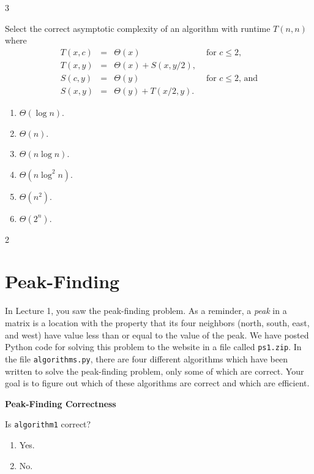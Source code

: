 \documentclass[12pt,twoside]{article}
\begin{document}
\begin{problems}
\begin{problemparts}
\ifsolution \solution{}
3
\fi

\problempart {}
Select the correct asymptotic complexity
of an algorithm with runtime $T(n, n)$
where 
$$
\begin{array}{rcll}
T(x, c) &=& \Theta(x) & \textrm{ for $c \le 2$}, \\
T(x, y) &=& \Theta(x) + S(x, y / 2), \\
S(c, y) &=& \Theta(y) & \textrm{ for $c \le 2$, and} \\
S(x, y) &=& \Theta(y) + T(x / 2, y).
\end{array}
$$

\begin{enumerate}
\item $\Theta(\log n)$.
\item $\Theta(n)$.
\item $\Theta(n \log n)$.
\item $\Theta(n \log^2 n)$.
\item $\Theta(n^2)$.
\item $\Theta(2^n)$.
\end{enumerate}

\ifsolution \solution{}
2
\fi

\end{problemparts}

\section*{Peak-Finding}

In Lecture 1,
you saw the peak-finding problem.
As a reminder,
a \emph{peak} in a matrix
is a location with the property that its four neighbors
(north, south, east, and west)
have value less than or equal to the value of the peak.
We have posted Python code for solving this problem
to the website in a file called \texttt{ps1.zip}.
In the file \texttt{algorithms.py},
there are four different algorithms
which have been written
to solve the peak-finding problem,
only some of which are correct.
Your goal is to figure out
which of these algorithms are correct
and which are efficient.

\problem {} \textbf{Peak-Finding Correctness}

\begin{problemparts}

\problempart {} Is \texttt{algorithm1} correct?
\begin{enumerate}
\item Yes.
\item No.
\end{enumerate}


\end{problemparts}
\end{problems}
\end{document}
